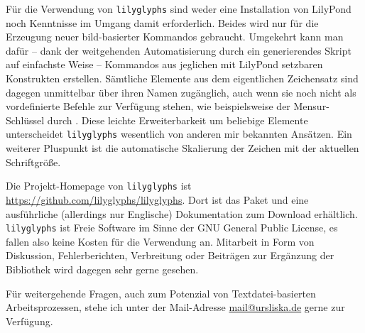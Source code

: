 \documentclass[DIV=13]{scrartcl}
\begin{document}
Für die Verwendung von \texttt{lilyglyphs} sind weder eine Installation von LilyPond noch Kenntnisse im Umgang damit erforderlich.
Beides wird nur für die Erzeugung neuer bild-basierter Kommandos gebraucht.
Umgekehrt kann man dafür -- dank der weitgehenden Automatisierung durch ein generierendes Skript auf einfachste Weise -- Kommandos aus jeglichen mit LilyPond setzbaren Konstrukten erstellen.
Sämtliche Elemente aus dem eigentlichen Zeichensatz sind dagegen unmittelbar über ihren Namen zugänglich, auch wenn sie noch nicht als vordefinierte Befehle zur Verfügung stehen, wie beispielsweise der Mensur-Schlüssel  durch .
Diese leichte Erweiterbarkeit um beliebige Elemente unterscheidet \texttt{lilyglyphs} wesentlich von anderen mir bekannten Ansätzen.
Ein weiterer Pluspunkt ist die automatische Skalierung der Zeichen mit der aktuellen Schriftgröße.

\medskip
Die Projekt-Homepage von \texttt{lilyglyphs} ist \url{https://github.com/lilyglyphs/lilyglyphs}. 
Dort ist das Paket und eine ausführliche (allerdings nur Englische) Dokumentation zum Download erhältlich.
\texttt{lilyglyphs} ist Freie Software im Sinne der GNU General Public License, es fallen also keine Kosten für die Verwendung an.
Mitarbeit in Form von Diskussion, Fehlerberichten, Verbreitung oder Beiträgen zur Ergänzung der Bibliothek wird dagegen sehr gerne gesehen.

Für weitergehende Fragen, auch zum Potenzial von Textdatei-basierten Arbeitsprozessen, stehe ich unter der Mail-Adresse \href{mailto:mail@ursliska.de}{mail@ursliska.de} gerne zur Verfügung.
\end{document}

